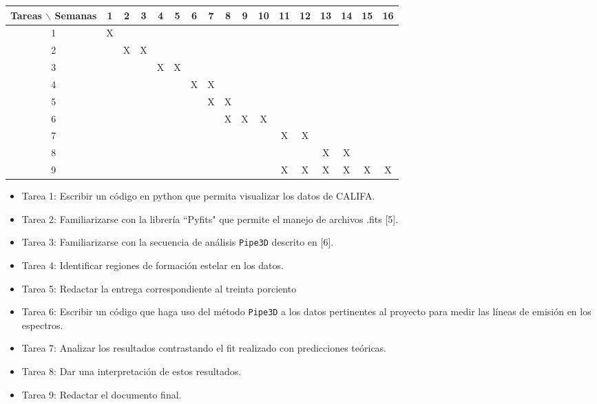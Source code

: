 \documentclass[12pt]{article}
\begin{document}
\begin{table}[htb]
	\begin{tabular}{|c|cccccccccccccccc| }
	\hline
	Tareas $\backslash$ Semanas & 1 & 2 & 3 & 4 & 5 & 6 & 7 & 8 & 9 & 10 & 11 & 12 & 13 & 14 & 15 & 16  \\
	\hline
	1 & X &   &   &   &   &   &   &   &   &   &   &   &   &   &   &   \\
	2 &   & X & X &   &   &   &   &   &   &   &   &   &   &   &   &   \\
	3 &   &   &   & X & X &   &   &   &   &   &   &   &   &   &   &   \\
	4 &   &   &   &   &   & X & X &   &   &   &   &   &   &   &   &   \\
	5 &   &   &   &   &   &   & X & X &   &   &   &   &   &   &   &   \\
	6 &   &   &   &   &   &   &   & X & X & X &   &   &   &   &   &   \\
	7 &   &   &   &   &   &   &   &   &   &   & X & X &   &   &   &   \\
	8 &   &   &   &   &   &   &   &   &   &   &   &   & X & X &   &   \\
	9 &   &   &   &   &   &   &   &   &   &   & X & X & X & X & X & X \\
	\hline
	\end{tabular}
\end{table}
\vspace{1mm}

\begin{itemize}
    \item Tarea 1: Escribir un c\'odigo en python que permita visualizar los datos de CALIFA.
    \item Tarea 2: Familiarizarse con la librer\'ia ``Pyfits" que
      permite el manejo de archivos .fits [5].
    \item Tarea 3: Familiarizarse con la secuencia de an\'alisis \texttt{Pipe3D} descrito en [6].
    \item Tarea 4: Identificar regiones de formaci\'on estelar en
      los datos.
    \item Tarea 5: Redactar la entrega correspondiente al treinta porciento
    \item Tarea 6: Escribir un c\'odigo que haga uso del m\'etodo 
      \texttt{Pipe3D} a los datos pertinentes al proyecto para medir las l\'ineas
      de emisi\'on en los espectros.
    \item Tarea 7: Analizar los resultados contrastando el fit
      realizado con predicciones te\'oricas.
    \item Tarea 8: Dar una interpretaci\'on de estos resultados.
    \item Tarea 9: Redactar el documento final.
\end{itemize}
\end{document}
